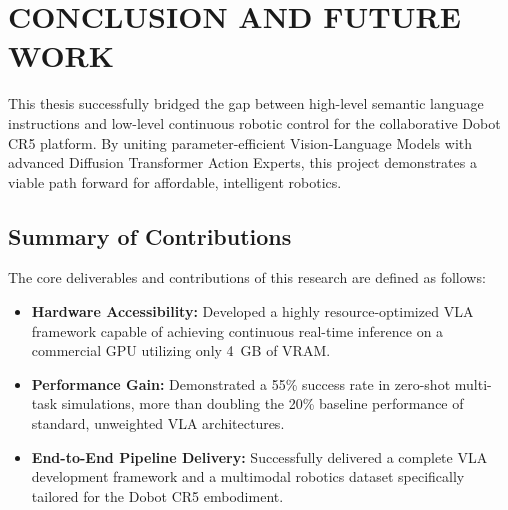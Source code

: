 
\chapter{CONCLUSION AND FUTURE WORK}
\label{chap:conclusion}

This thesis successfully bridged the gap between high-level semantic language instructions and low-level continuous robotic control for the collaborative Dobot CR5 platform. By uniting parameter-efficient Vision-Language Models with advanced Diffusion Transformer Action Experts, this project demonstrates a viable path forward for affordable, intelligent robotics.

\section{Summary of Contributions}
The core deliverables and contributions of this research are defined as follows:
\begin{itemize}
    \item \textbf{Hardware Accessibility:} Developed a highly resource-optimized VLA framework capable of achieving continuous real-time inference on a commercial GPU utilizing only 4~GB of VRAM.
    \item \textbf{Performance Gain:} Demonstrated a 55\% success rate in zero-shot multi-task simulations, more than doubling the 20\% baseline performance of standard, unweighted VLA architectures.
    \item \textbf{End-to-End Pipeline Delivery:} Successfully delivered a complete VLA development framework and a multimodal robotics dataset specifically tailored for the Dobot CR5 embodiment.
\end{itemize}

